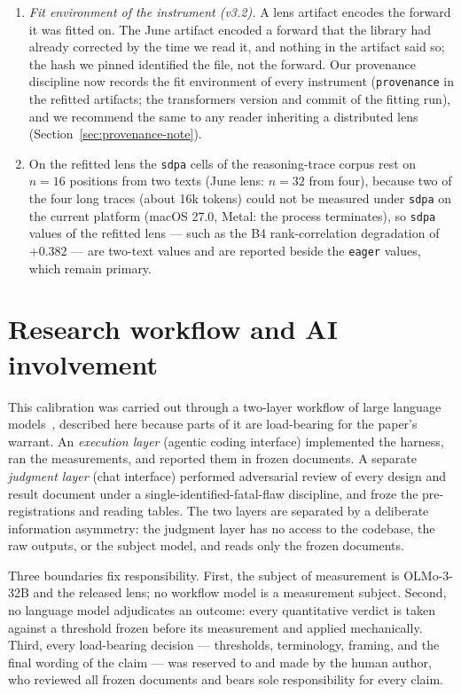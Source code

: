 \documentclass[11pt]{article}
\begin{document}
\begin{enumerate}
\item \emph{Fit environment of the instrument (v3.2).} A lens artifact encodes the forward it was fitted on. The June artifact encoded a forward that the library had already corrected by the time we read it, and nothing in the artifact said so; the hash we pinned identified the file, not the forward. Our provenance discipline now records the fit environment of every instrument (\texttt{provenance} in the refitted artifacts; the transformers version and commit of the fitting run), and we recommend the same to any reader inheriting a distributed lens (Section~\ref{sec:provenance-note}).
\item On the refitted lens the \texttt{sdpa} cells of the reasoning-trace corpus rest on $n = 16$ positions from two texts (June lens: $n = 32$ from four), because two of the four long traces (about 16k tokens) could not be measured under \texttt{sdpa} on the current platform (macOS 27.0, Metal: the process terminates), so \texttt{sdpa} values of the refitted lens --- such as the B4 rank-correlation degradation of $+0.382$ --- are two-text values and are reported beside the \texttt{eager} values, which remain primary.
\end{enumerate}

\section{Research workflow and AI involvement}
\label{sec:workflow}

This calibration was carried out through a two-layer workflow of large
language models~\cite{anthropic2026claude}, described here because parts
of it are load-bearing for the paper's warrant. An \emph{execution layer}
(agentic coding interface) implemented the harness, ran the measurements,
and reported them in frozen documents. A separate \emph{judgment layer}
(chat interface) performed adversarial review of every design and result
document under a single-identified-fatal-flaw discipline, and froze the
pre-registrations and reading tables. The two layers are separated by a
deliberate information asymmetry: the judgment layer has no access to the
codebase, the raw outputs, or the subject model, and reads only the
frozen documents.

Three boundaries fix responsibility. First, the subject of measurement is
OLMo-3-32B and the released lens; no workflow model is a measurement
subject. Second, no language model adjudicates an outcome: every
quantitative verdict is taken against a threshold frozen before its
measurement and applied mechanically. Third, every load-bearing decision
--- thresholds, terminology, framing, and the final wording of the claim
--- was reserved to and made by the human author, who reviewed all frozen
documents and bears sole responsibility for every claim.
\end{document}
